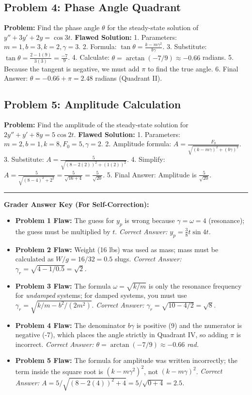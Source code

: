 \documentclass[11pt]{article}
\begin{document}
\subsection{Problem 4: Phase Angle Quadrant}
\textbf{Problem:} Find the phase angle $\theta$ for the steady-state solution of $y'' + 3y' + 2y = \cos 3t$.
\textbf{Flawed Solution:}
1. Parameters: $m=1, b=3, k=2, \gamma=3$.
2. Formula: $\tan \theta = \frac{k-m\gamma^2}{b\gamma}$.
3. Substitute: $\tan \theta = \frac{2 - 1(9)}{3(3)} = \frac{-7}{9}$.
4. Calculate: $\theta = \arctan(-7/9) \approx -0.66$ radians.
5. Because the tangent is negative, we must add $\pi$ to find the true angle.
6. Final Answer: $\theta = -0.66 + \pi = 2.48$ radians (Quadrant II).

\subsection{Problem 5: Amplitude Calculation}
\textbf{Problem:} Find the amplitude of the steady-state solution for $2y'' + y' + 8y = 5 \cos 2t$.
\textbf{Flawed Solution:}
1. Parameters: $m=2, b=1, k=8, F_0=5, \gamma=2$.
2. Amplitude formula: $A = \frac{F_0}{\sqrt{(k-m\gamma)^2 + (b\gamma)^2}}$.
3. Substitute: $A = \frac{5}{\sqrt{(8 - 2(2))^2 + (1(2))^2}}$.
4. Simplify: $A = \frac{5}{\sqrt{(8 - 4)^2 + 2^2}} = \frac{5}{\sqrt{16 + 4}} = \frac{5}{\sqrt{20}}$.
5. Final Answer: Amplitude is $\frac{5}{\sqrt{20}}$.

\vspace{1cm}
\hrule
\vspace{0.5cm}
\textbf{Grader Answer Key (For Self-Correction):}
\begin{itemize}
    \item \textbf{Problem 1 Flaw:} The guess for $y_p$ is wrong because $\gamma = \omega = 4$ (resonance); the guess must be multiplied by $t$. \textit{Correct Answer: $y_p = \frac{3}{8} t \sin 4t$.}
    \item \textbf{Problem 2 Flaw:} Weight (16 lbs) was used as mass; mass must be calculated as $W/g = 16/32 = 0.5$ slugs. \textit{Correct Answer: $\gamma_r = \sqrt{4 - 1/0.5} = \sqrt{2}$.}
    \item \textbf{Problem 3 Flaw:} The formula $\omega = \sqrt{k/m}$ is only the resonance frequency for \textit{undamped} systems; for damped systems, you must use $\gamma_r = \sqrt{k/m - b^2/(2m^2)}$. \textit{Correct Answer: $\gamma_r = \sqrt{10 - 4/2} = \sqrt{8}$.}
    \item \textbf{Problem 4 Flaw:} The denominator $b\gamma$ is positive (9) and the numerator is negative (-7), which places the angle strictly in Quadrant IV, so adding $\pi$ is incorrect. \textit{Correct Answer: $\theta = \arctan(-7/9) \approx -0.66$ rad.}
    \item \textbf{Problem 5 Flaw:} The formula for amplitude was written incorrectly; the term inside the square root is $(k-m\gamma^2)^2$, not $(k-m\gamma)^2$. \textit{Correct Answer: $A = 5 / \sqrt{(8 - 2(4))^2 + 4} = 5 / \sqrt{0 + 4} = 2.5$.}
\end{itemize}
\end{document}
